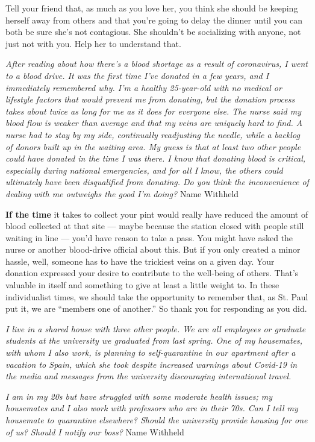 Tell your friend that, as much as you love her, you think she should be
keeping herself away from others and that you're going to delay the
dinner until you can both be sure she's not contagious. She shouldn't be
socializing with anyone, not just not with you. Help her to understand
that.

\emph{After reading about how there's a blood shortage as a result of
coronavirus, I went to a blood drive. It was the first time I've donated
in a few years, and I immediately remembered why. I'm a healthy
25-year-old with no medical or lifestyle factors that would prevent me
from donating, but the donation process takes about twice as long for me
as it does for everyone else. The nurse said my blood flow is weaker
than average and that my veins are uniquely hard to find. A nurse had to
stay by my side, continually readjusting the needle, while a backlog of
donors built up in the waiting area. My guess is that at least two other
people could have donated in the time I was there. I know that donating
blood is critical, especially during national emergencies, and for all I
know, the others could ultimately have been disqualified from donating.
Do you think the inconvenience of dealing with me outweighs the good I'm
doing?} Name Withheld

\textbf{If the time} it takes to collect your pint would really have
reduced the amount of blood collected at that site --- maybe because the
station closed with people still waiting in line --- you'd have reason
to take a pass. You might have asked the nurse or another blood-drive
official about this. But if you only created a minor hassle, well,
someone has to have the trickiest veins on a given day. Your donation
expressed your desire to contribute to the well-being of others. That's
valuable in itself and something to give at least a little weight to. In
these individualist times, we should take the opportunity to remember
that, as St. Paul put it, we are ``members one of another.'' So thank
you for responding as you did.

\emph{I live in a shared house with three other people. We are all
employees or graduate students at the university we graduated from last
spring. One of my housemates, with whom I also work, is planning to
self-quarantine in our apartment after a vacation to Spain, which she
took despite increased warnings about Covid-19 in the media and messages
from the university discouraging international travel.}

\emph{I am in my 20s but have struggled with some moderate health
issues; my housemates and I also work with professors who are in their
70s. Can I tell my housemate to quarantine elsewhere? Should the
university provide housing for one of us? Should I notify our boss?}
Name Withheld

